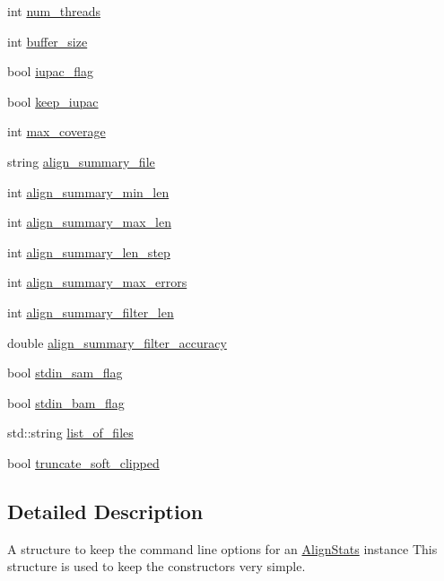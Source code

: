 \begin{DoxyCompactItemize}
\item 
int \hyperlink{struct_align_stats_1_1options_a5e25dc83b0fc3c8e955bf4267c6dc7d2}{num\_\-threads}
\item 
int \hyperlink{struct_align_stats_1_1options_aadebe419d97d862d6441d1563367e246}{buffer\_\-size}
\item 
bool \hyperlink{struct_align_stats_1_1options_aed2b228a0a13d98c5d544a48d4091b09}{iupac\_\-flag}
\item 
bool \hyperlink{struct_align_stats_1_1options_a64eb45282d8d26af88352817d84cd94a}{keep\_\-iupac}
\item 
int \hyperlink{struct_align_stats_1_1options_af7fdf5340fa114c3296fd3f675b48b4f}{max\_\-coverage}
\item 
string \hyperlink{struct_align_stats_1_1options_a5b6f3a50319bd5bea781818bd6c83aa0}{align\_\-summary\_\-file}
\item 
int \hyperlink{struct_align_stats_1_1options_a4477e10888176b696fbe80caec742fc2}{align\_\-summary\_\-min\_\-len}
\item 
int \hyperlink{struct_align_stats_1_1options_a119003c51a782cc237af14b164d529a3}{align\_\-summary\_\-max\_\-len}
\item 
int \hyperlink{struct_align_stats_1_1options_a2e2cd52d35bdc24f73ad1c61e8638ab0}{align\_\-summary\_\-len\_\-step}
\item 
int \hyperlink{struct_align_stats_1_1options_a2d920885b7f36b06c6bd08d2634cabef}{align\_\-summary\_\-max\_\-errors}
\item 
int \hyperlink{struct_align_stats_1_1options_ae9989ba9b255f20000d48ac1920bba31}{align\_\-summary\_\-filter\_\-len}
\item 
double \hyperlink{struct_align_stats_1_1options_ac96a618a5c1c0f097c7e3f0c92c4d709}{align\_\-summary\_\-filter\_\-accuracy}
\item 
bool \hyperlink{struct_align_stats_1_1options_ac71f2469bdd8a1303cb7fbc21bf6d61a}{stdin\_\-sam\_\-flag}
\item 
bool \hyperlink{struct_align_stats_1_1options_a134d6b9c72e42947b581cc9d88c7f219}{stdin\_\-bam\_\-flag}
\item 
std::string \hyperlink{struct_align_stats_1_1options_a9e16b499aaad5e645652bbc234dc018f}{list\_\-of\_\-files}
\item 
bool \hyperlink{struct_align_stats_1_1options_a1df99156054317dbb94f18912ee045b7}{truncate\_\-soft\_\-clipped}
\end{DoxyCompactItemize}


\subsection{Detailed Description}
A structure to keep the command line options for an \hyperlink{class_align_stats}{AlignStats} instance This structure is used to keep the constructors very simple. 

